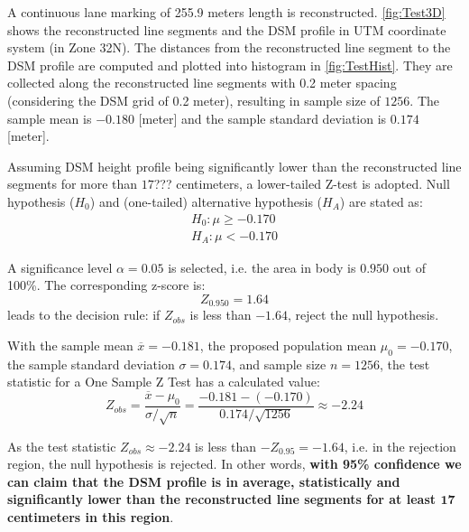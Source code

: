 A continuous lane marking of 255.9 meters length is reconstructed. \cref{fig:Test3D} shows the reconstructed line segments and the DSM profile in UTM coordinate system (in Zone 32N). The distances from the reconstructed line segment to the DSM profile are computed and plotted into histogram in \cref{fig:TestHist}. They are collected along the reconstructed line segments with 0.2 meter spacing (considering the DSM grid of 0.2 meter), resulting in sample size of $1256$. The sample mean is $-0.180$ [meter] and the sample standard deviation is $0.174$ [meter]. %

Assuming DSM height profile being significantly lower than the reconstructed line segments for more than $17$??? centimeters, a lower-tailed Z-test is adopted. Null hypothesis ($H_0$) and (one-tailed) alternative hypothesis ($H_A$) are stated as:
\begin{equation*}
\begin{split}
H_0: \mu\geq-0.170\\
H_A: \mu<-0.170
\end{split}
\end{equation*}

A significance level $\alpha=0.05$ is selected, i.e. the area in body is $0.950$ out of 100\%. The corresponding z-score is:
\begin{equation*}
Z_{0.950}=1.64
\end{equation*}
leads to the decision rule: if $Z_{obs}$ is less than $-1.64$, reject the null hypothesis.

With the sample mean $\overline{x}=-0.181$,
the proposed population mean $\mu_0=-0.170$,
the sample standard deviation $\sigma=0.174$,
and sample size $n=1256$, the test statistic for a One Sample Z Test has a calculated value:
\begin{equation*}
Z_{obs} = \frac{\overline{x}-\mu_0}{\sigma/\sqrt{n}}=\frac{-0.181-(-0.170)}{0.174/\sqrt{1256}}\approx-2.24
\end{equation*}

As the test statistic $Z_{obs}\approx-2.24$ is less than $-Z_{0.95}=-1.64$, i.e. in the rejection region, the null hypothesis is rejected. In other words, \textbf{with 95\% confidence we can claim that the DSM profile is in average, statistically and significantly lower than the reconstructed line segments for at least $\mathbf{17}$ centimeters in this region}. %

